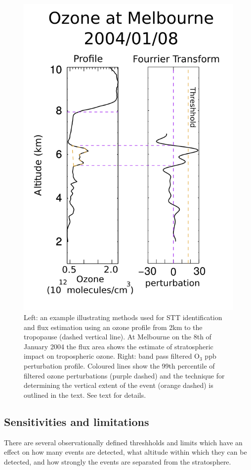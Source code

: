 \documentclass{article}
\begin{document}
    \begin{figure}[!htbp]
      \begin{center}
      \includegraphics[width=0.8\columnwidth]{figures/filtereg.png}
      \caption{ Left: an example illustrating methods used for STT identification and flux estimation using an ozone profile from 2km to the tropopause (dashed vertical line).
      At Melbourne on the 8th of January 2004 the flux area shows the estimate of stratospheric impact on tropospheric ozone.
      Right: band pass filtered O$_3$ ppb perturbation profile.
      Coloured lines show the 99th percentile of filtered ozone perturbations (purple dashed) and the technique for determining the vertical extent of the event (orange dashed) is outlined in the text.
      See text for details.
      }
      \label{fig:filterEG}
      \end{center}
    \end{figure}

  \subsection{Sensitivities and limitations}
    There are several observationally defined threshholds and limits which have an effect on how many events are detected, what altitude within which they can be detected, and how strongly the events are separated from the stratosphere.
    
\end{document}
